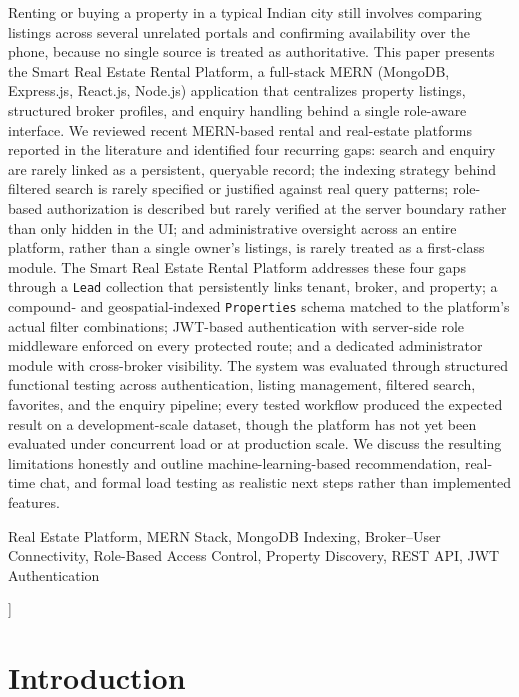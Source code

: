 \documentclass[10pt,twocolumn]{article}
\newcommand{\ieeeabstract}[1]{\noindent{\bfseries \emph{Abstract}---}#1}
\newcommand{\ieeeindex}[1]{\noindent{\bfseries \emph{Index Terms}---}#1}
\begin{document}
\begin{minipage}{\textwidth}
\small
\ieeeabstract{Renting or buying a property in a typical Indian city still involves comparing listings across several unrelated portals and confirming availability over the phone, because no single source is treated as authoritative. This paper presents the Smart Real Estate Rental Platform, a full-stack MERN (MongoDB, Express.js, React.js, Node.js) application that centralizes property listings, structured broker profiles, and enquiry handling behind a single role-aware interface. We reviewed recent MERN-based rental and real-estate platforms reported in the literature and identified four recurring gaps: search and enquiry are rarely linked as a persistent, queryable record; the indexing strategy behind filtered search is rarely specified or justified against real query patterns; role-based authorization is described but rarely verified at the server boundary rather than only hidden in the UI; and administrative oversight across an entire platform, rather than a single owner's listings, is rarely treated as a first-class module. The Smart Real Estate Rental Platform addresses these four gaps through a \texttt{Lead} collection that persistently links tenant, broker, and property; a compound- and geospatial-indexed \texttt{Properties} schema matched to the platform's actual filter combinations; JWT-based authentication with server-side role middleware enforced on every protected route; and a dedicated administrator module with cross-broker visibility. The system was evaluated through structured functional testing across authentication, listing management, filtered search, favorites, and the enquiry pipeline; every tested workflow produced the expected result on a development-scale dataset, though the platform has not yet been evaluated under concurrent load or at production scale. We discuss the resulting limitations honestly and outline machine-learning-based recommendation, real-time chat, and formal load testing as realistic next steps rather than implemented features.}
\vspace{4pt}

\ieeeindex{Real Estate Platform, MERN Stack, MongoDB Indexing, Broker--User Connectivity, Role-Based Access Control, Property Discovery, REST API, JWT Authentication}
\vspace{8pt}
\end{minipage}
]

\section{Introduction}
\end{document}
